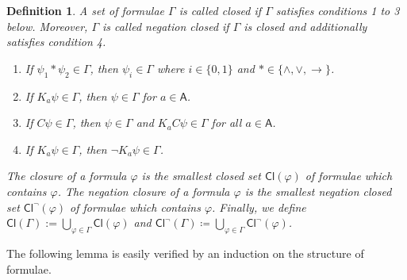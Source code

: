 \documentclass{myifcolog}
\newcommand\C {C}
\newcommand{\K}{K}
\newcommand\Cl {\mathsf{Cl}}
\newcommand\A{\mathsf{A}}
\newcommand{\agi}{a}
\newtheorem{definition}[theorem]{Definition}
\numberwithin{theorem}{section}
\begin{document}
\begin{definition}\label{d: closure}
         A set of formulae $\Gamma$ is called \emph{closed} if $\Gamma$ satisfies conditions 1 to 3 below. Moreover, $\Gamma$ is called \emph{negation closed} if $\Gamma$ is closed and additionally satisfies condition 4.
         \begin{enumerate}
        \item If $\psi_1 \ast \psi_2 \in \Gamma$, then $\psi_i \in \Gamma$ where $i \in \{0,1\}$ and $\ast \in \{\wedge, \vee, \rightarrow\}$.
        \item If $K_\agi \psi \in \Gamma$, then $\psi \in \Gamma$ for $\agi \in \A$.
        \item If $\C \psi \in \Gamma$, then $\psi \in \Gamma$ and $\K_\agi \C \psi \in \Gamma$ for all $\agi \in \A$.
        \item If $K_\agi \psi \in \Gamma$, then $\neg K_\agi \psi \in \Gamma$.
    \end{enumerate}
     The \emph{closure} of a formula $\varphi$ is the smallest closed set $\Cl(\varphi)$ of formulae which contains $\varphi$.  The \emph{negation closure} of a formula $\varphi$ is the smallest negation closed set $\Cl^\neg(\varphi)$ of formulae which contains $\varphi$. Finally, we define $\Cl(\Gamma):= \bigcup_{\varphi\in\Gamma}\Cl(\varphi)$ and $\Cl^\neg(\Gamma) \coloneqq \bigcup_{\varphi \in \Gamma} \Cl^\neg (\varphi)$.
     \end{definition}
         
        



 The following lemma is easily verified by an induction on the structure of formulae.
\end{document}

